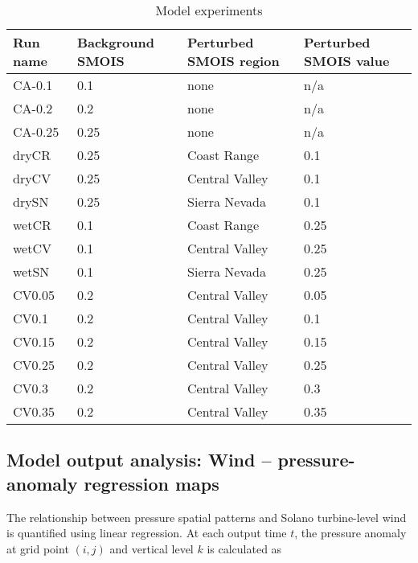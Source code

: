 \begin{table}
\begin{tabular}{l l l l}
\hline
Run name & Background SMOIS & Perturbed SMOIS region & Perturbed SMOIS value \\
\hline
CA-0.1 & 0.1 & none & n/a \\
CA-0.2 & 0.2 & none & n/a \\
CA-0.25 & 0.25 & none & n/a \\
dryCR & 0.25 & Coast Range & 0.1 \\
dryCV & 0.25 & Central Valley & 0.1 \\
drySN & 0.25 & Sierra Nevada & 0.1 \\
wetCR & 0.1 & Coast Range & 0.25 \\
wetCV & 0.1 & Central Valley & 0.25 \\
wetSN & 0.1 & Sierra Nevada & 0.25 \\
CV0.05 & 0.2 & Central Valley & 0.05 \\
CV0.1 & 0.2 & Central Valley & 0.1 \\
CV0.15 & 0.2 & Central Valley & 0.15 \\
CV0.25 & 0.2 & Central Valley & 0.25 \\
CV0.3 & 0.2 & Central Valley & 0.3 \\
CV0.35 & 0.2 & Central Valley & 0.35 \\
\hline
\end{tabular}
\caption{Model experiments}
\label{table:windSol_runlist}
\end{table}

\subsection{Model output analysis: Wind -- pressure-anomaly regression maps}
\label{subsec:WindPresRegression}

The relationship between pressure spatial patterns and Solano turbine-level wind is quantified using linear regression.  At each output time $t$, the pressure anomaly at grid point $(i,j)$ and vertical level $k$ is calculated as

